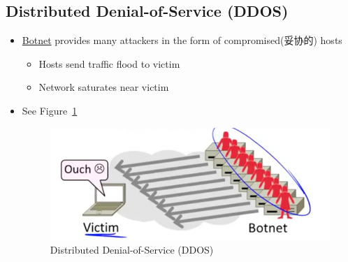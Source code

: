 \documentclass[12pt]{ctexart}   %
\begin{document}
	\subsection{Distributed Denial-of-Service (DDOS)}
	\begin{itemize}
		\item \underline{Botnet} provides many attackers in the form of compromised(妥协的) hosts
		\begin{itemize}
			\item Hosts send traffic flood to victim 
			\item Network saturates near victim
		\end{itemize}
		\item See Figure~\ref{fig:10-9-3}
		  
		\begin{figure}[h!] %
		\centering
		\includegraphics[scale=0.7]{images/10-9-3}
		\caption{Distributed Denial-of-Service (DDOS)}
		\label{fig:10-9-3}
		\end{figure}
	\end{itemize}
\end{document}
